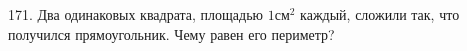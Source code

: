 171. Два одинаковых квадрата, площадью $1\text{см}^2$ каждый, сложили так, что получился прямоугольник. Чему равен его периметр?\\
